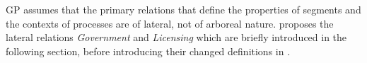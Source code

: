 \Gls{GP} assumes that the primary relations that define
the properties of segments and the contexts of processes are
of lateral, not of arboreal nature.
\Cite{kaye1990} proposes the lateral relations \emph{Government} and
\emph{Licensing} which are briefly introduced in the following section,
before introducing their changed definitions in \CVCV\footnotemark.
